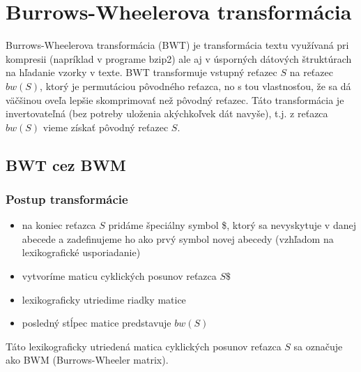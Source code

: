 
\section{Burrows-Wheelerova transformácia}
    Burrows-Wheelerova transformácia (BWT) je transformácia textu využívaná pri
    kompresii (napríklad v programe bzip2) ale aj v úsporných dátových
    štruktúrach na hľadanie vzorky v texte. BWT transformuje vstupný reťazec $S$
    na reťazec $bw(S)$, ktorý je permutáciou pôvodného reťazca, no s tou
    vlastnosťou, že sa dá väčšinou oveľa lepšie skomprimovať než pôvodný
    reťazec. Táto transformácia je invertovateľná (bez potreby uloženia
    akýchkoľvek dát navyše), t.j. z reťazca $bw(S)$ vieme získať pôvodný reťazec
    $S$.
    
    \subsection{BWT cez BWM}
    \subsubsection*{Postup transformácie}
    \begin{itemize}
        \item na koniec reťazca $S$ pridáme špeciálny symbol \$, ktorý sa
        nevyskytuje v danej abecede a zadefinujeme ho ako prvý symbol novej
        abecedy (vzhľadom na lexikografické usporiadanie)
        \item vytvoríme maticu cyklických posunov reťazca $S\$$
        \item lexikograficky utriedime riadky matice
        \item posledný stĺpec matice predstavuje $bw(S)$
    \end{itemize}
    
    Táto lexikograficky utriedená matica cyklických posunov reťazca $S$
    sa označuje ako BWM (Burrows-Wheeler matrix).
    
